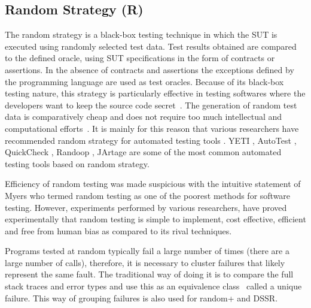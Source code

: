\documentclass{acm_proc_article-sp}
\begin{document}
\subsection{Random Strategy (R)}
The random strategy is a black-box testing technique in which the SUT is executed using randomly selected test data. Test results obtained are compared to the defined oracle, using SUT specifications in the form of contracts or assertions. In the absence of contracts and assertions the exceptions defined by the programming language are used as test oracles. Because of its black-box testing nature, this strategy is particularly effective in testing softwares where the developers want to keep the source code secret~\cite{Chen2010}. The generation of random test data is comparatively cheap and does not require too much intellectual and computational efforts~\cite{Ciupa2009, Ciupa2008}. It is mainly for this reason that various researchers have recommended random strategy for automated testing tools \cite{Ciupa2008a}. YETI \cite{Oriol2010a, Oriol2010}, AutoTest \cite{Leitner2007, Ciupa2007}, QuickCheck \cite{Claessen2000}, Randoop \cite{Pacheco2007}, JArtage \cite{Oriat2004} are some of the most common automated testing tools based on random strategy.

\indent Efficiency of random testing was made suspicious with the intuitive statement of Myers \cite{Myers2004} who termed random testing as one of the poorest methods for software testing. However, experiments performed by various researchers, \cite{Ciupa2007, Duran1981, Duran1984, Hamlet1994, Ntafos2001} have proved experimentally that random testing is simple to implement, cost effective, efficient and free from human bias as compared to its rival techniques.

Programs tested at random typically fail a large number of times (there are a large number of calls), therefore, it is necessary to cluster failures that likely represent the same fault. The traditional way of doing it is to compare the full stack traces and error types and use this as an equivalence class~\cite{Ciupa2007,Oriol2012} called a unique failure. This way of grouping failures is also used for random+ and DSSR.
\end{document}
